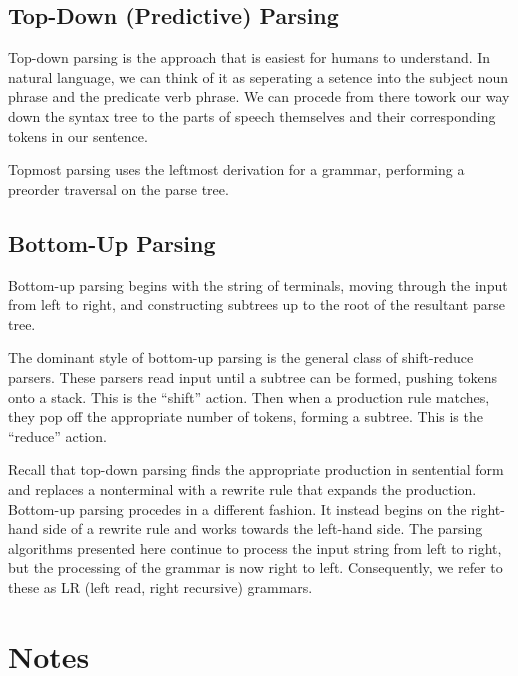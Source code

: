 \documentclass{article}[12pt]
\begin{document}
\subsection{Top-Down (Predictive) Parsing}
Top-down parsing is the approach that is easiest for humans to understand. In natural language, we can think of it as seperating a setence into the subject noun phrase and the predicate verb phrase. We can procede from there towork our way down the syntax tree to the parts of speech themselves and their corresponding tokens in our sentence. 

Topmost parsing uses the leftmost derivation for a grammar, performing a preorder traversal on the parse tree.

\subsection{Bottom-Up Parsing}
Bottom-up parsing begins with the string of terminals, moving through the input from left to right, and constructing subtrees up to the root of the resultant parse tree.

The dominant style of bottom-up parsing is the general class of shift-reduce parsers. These parsers read input until a subtree can be formed, pushing tokens onto a stack. This is the ``shift'' action. Then when a production rule matches, they pop off the appropriate number of tokens, forming a subtree. This is the ``reduce'' action. 

Recall that top-down parsing finds the appropriate production in sentential form and replaces a nonterminal with a rewrite rule that expands the production. Bottom-up parsing procedes in a different fashion. It instead begins on the right-hand side of a rewrite rule and works towards the left-hand side. The parsing algorithms presented here continue to process the input string from left to right, but the processing of the grammar is now right to left. Consequently, we refer to these as LR (left read, right recursive) grammars.


\section{Notes}
\end{document}
